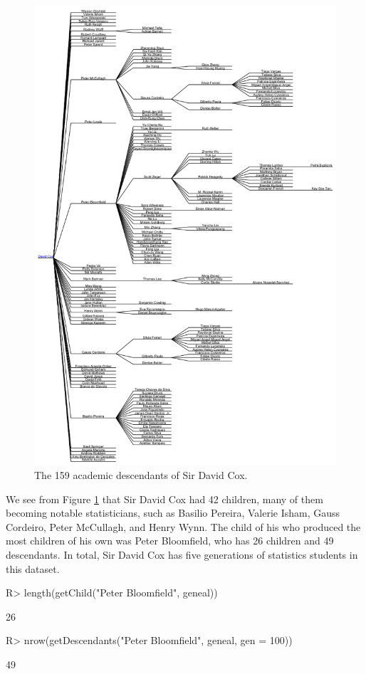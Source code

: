 \documentclass[article,shortnames]{jss}
\begin{document}
\begin{figure}%
    \centering
    \includegraphics[width=\textwidth]{dCox.png}
    \caption{The 159 academic descendants of Sir David Cox.}
    \label{fig:dCox}
\end{figure}

We see from Figure \ref{fig:dCox} that Sir David Cox had 42 children, many of them becoming notable statisticians, such as Basilio Pereira, Valerie Isham, Gauss Cordeiro, Peter McCullagh, and Henry Wynn. The child of his who produced the most children of his own was Peter Bloomfield, who has 26 children and 49 descendants. In total, Sir David Cox has five generations of statistics students in this dataset.

\begin{CodeChunk}
\begin{CodeInput}
R> length(getChild("Peter Bloomfield", geneal))
\end{CodeInput}
\begin{CodeOutput}
[1] 26
\end{CodeOutput}
\begin{CodeInput}
R> nrow(getDescendants("Peter Bloomfield", geneal, gen = 100))
\end{CodeInput}
\begin{CodeOutput}
[1] 49
\end{CodeOutput}
\end{CodeChunk}
\end{document}
